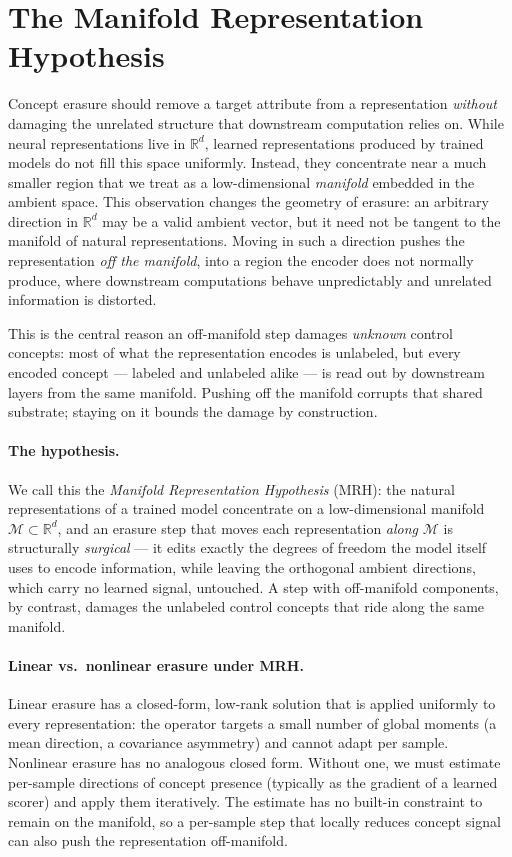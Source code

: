\section{The Manifold Representation Hypothesis}
\label{sec:mrh}

Concept erasure should remove a target attribute from a representation \emph{without} damaging the unrelated structure that downstream computation relies on. While neural representations live in $\mathbb{R}^d$, learned representations produced by trained models do not fill this space uniformly. Instead, they concentrate near a much smaller region that we treat as a low-dimensional \emph{manifold} embedded in the ambient space. This observation changes the geometry of erasure: an arbitrary direction in $\mathbb{R}^d$ may be a valid ambient vector, but it need not be tangent to the manifold of natural representations. Moving in such a direction pushes the representation \emph{off the manifold}, into a region the encoder does not normally produce, where downstream computations behave unpredictably and unrelated information is distorted.

This is the central reason an off-manifold step damages \emph{unknown} control concepts: most of what the representation encodes is unlabeled, but every encoded concept --- labeled and unlabeled alike --- is read out by downstream layers from the same manifold. Pushing off the manifold corrupts that shared substrate; staying on it bounds the damage by construction.

\paragraph{The hypothesis.}
We call this the \emph{Manifold Representation Hypothesis} (MRH): the natural representations of a trained model concentrate on a low-dimensional manifold $\mathcal{M} \subset \mathbb{R}^d$, and an erasure step that moves each representation \emph{along} $\mathcal{M}$ is structurally \emph{surgical} --- it edits exactly the degrees of freedom the model itself uses to encode information, while leaving the orthogonal ambient directions, which carry no learned signal, untouched. A step with off-manifold components, by contrast, damages the unlabeled control concepts that ride along the same manifold.

\paragraph{Linear vs.\ nonlinear erasure under MRH.}
Linear erasure has a closed-form, low-rank solution that is applied uniformly to every representation: the operator targets a small number of global moments (a mean direction, a covariance asymmetry) and cannot adapt per sample. Nonlinear erasure has no analogous closed form. Without one, we must estimate per-sample directions of concept presence (typically as the gradient of a learned scorer) and apply them iteratively. The estimate has no built-in constraint to remain on the manifold, so a per-sample step that locally reduces concept signal can also push the representation off-manifold.

